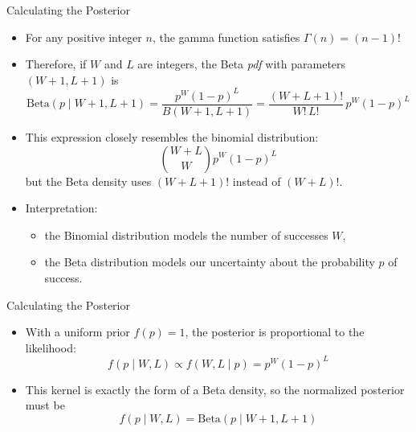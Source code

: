 \documentclass[handout]{beamer}
\begin{document}
\begin{frame}{Calculating the Posterior}
\scriptsize{

\begin{itemize}

\item For any positive integer $n$, the gamma function satisfies $\Gamma(n) = (n-1)!$

\item Therefore, if $W$ and $L$ are integers, the Beta \emph{pdf} with parameters $(W+1, L+1)$ is
\begin{displaymath}
\mathrm{Beta}(p \mid W+1,L+1)
= \frac{p^{W}(1-p)^{L}}{B(W+1,L+1)}
= \frac{(W+L+1)!}{W!\,L!}\,p^{W}(1-p)^{L}
\end{displaymath}

\item This expression closely resembles the binomial distribution:
\[
\binom{W+L}{W}p^W(1-p)^L
\]
but the Beta density uses $(W+L+1)!$ instead of $(W+L)!$.

\item Interpretation:
\begin{itemize}\scriptsize
\item the Binomial distribution models the number of successes $W$,
\item the Beta distribution models our uncertainty about the probability $p$ of success.
\end{itemize}

\end{itemize}
}
\end{frame}



\begin{frame}{Calculating the Posterior}
\scriptsize{

\begin{itemize}

\item With a uniform prior $f(p)=1$, the posterior is proportional to the likelihood:
\[
f(p \mid W,L)\propto f(W,L\mid p) = p^W(1-p)^L
\]

\item This kernel is exactly the form of a Beta density, so the normalized posterior must be
\[
f(p \mid W,L) = \mathrm{Beta}(p \mid W+1, L+1)
\]


\end{itemize}
}
\end{frame}
\end{document}
